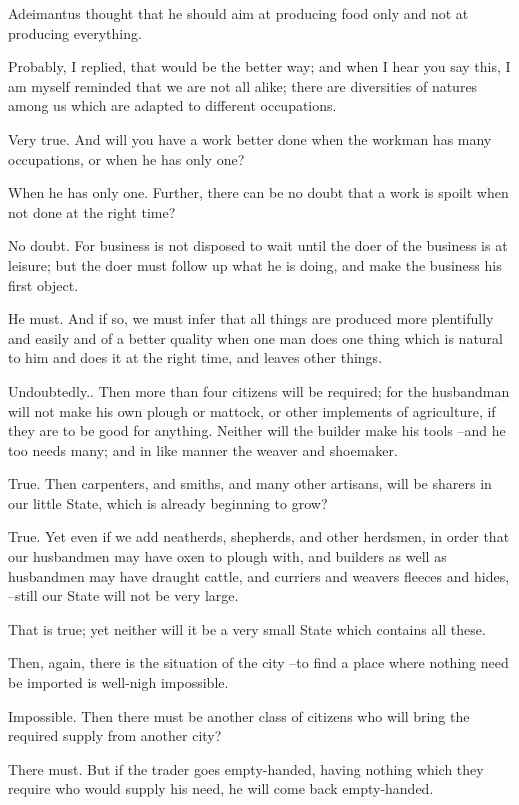 Adeimantus thought that he should aim at producing food only and not at producing everything.

Probably, I replied, that would be the better way; and when I hear you say this, I am myself reminded that we are not all alike; there are diversities of natures among us which are adapted to different occupations.

Very true.
And will you have a work better done when the workman has many occupations, or when he has only one?

When he has only one.
Further, there can be no doubt that a work is spoilt when not done at the right time?

No doubt.
For business is not disposed to wait until the doer of the business is at leisure; but the doer must follow up what he is doing, and make the business his first object.

He must.
And if so, we must infer that all things are produced more plentifully and easily and of a better quality when one man does one thing which is natural to him and does it at the right time, and leaves other things.

Undoubtedly..
Then more than four citizens will be required; for the husbandman will not make his own plough or mattock, or other implements of agriculture, if they are to be good for anything. Neither will the builder make his tools --and he too needs many; and in like manner the weaver and shoemaker.

True.
Then carpenters, and smiths, and many other artisans, will be sharers in our little State, which is already beginning to grow?

True.
Yet even if we add neatherds, shepherds, and other herdsmen, in order that our husbandmen may have oxen to plough with, and builders as well as husbandmen may have draught cattle, and curriers and weavers fleeces and hides, --still our State will not be very large.

That is true; yet neither will it be a very small State which contains all these.

Then, again, there is the situation of the city --to find a place where nothing need be imported is well-nigh impossible.

Impossible.
Then there must be another class of citizens who will bring the required supply from another city?

There must.
But if the trader goes empty-handed, having nothing which they require who would supply his need, he will come back empty-handed.

